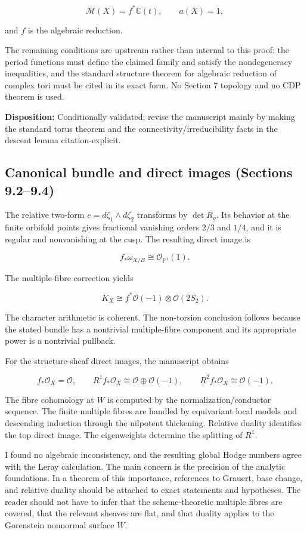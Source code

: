 \documentclass[
  10pt,
  letterpaper,
]{article}
\newcommand{\Pone}{\mathbb P^1}
\newcommand{\cO}{\mathcal O}
\begin{document}
\[
\mathcal M(X)=f^*\mathbb C(t),
\qquad a(X)=1,
\]

and \(f\) is the algebraic reduction.

The remaining conditions are upstream rather than internal to this
proof: the period functions must define the claimed family and satisfy
the nondegeneracy inequalities, and the standard structure theorem for
algebraic reduction of complex tori must be cited in its exact form. No
Section 7 topology and no CDP theorem is used.

\textbf{Disposition:} Conditionally validated; revise the manuscript
mainly by making the standard torus theorem and the
connectivity/irreducibility facts in the descent lemma
citation-explicit.

\subsection{Canonical bundle and direct images (Sections
9.2--9.4)}\label{canonical-bundle-and-direct-images-sections-9.29.4}

The relative two-form \(e=d\zeta_1\wedge d\zeta_2\) transforms by
\(\det R_g\). Its behavior at the finite orbifold points gives
fractional vanishing orders \(2/3\) and \(1/4\), and it is regular and
nonvanishing at the cusp. The resulting direct image is

\[
f_*\omega_{X/B}\cong\cO_{\Pone}(1).
\]

The multiple-fibre correction yields

\[
K_X\cong f^*\cO(-1)\otimes\cO(2S_2).
\]

The character arithmetic is coherent. The non-torsion conclusion follows
because the stated bundle has a nontrivial multiple-fibre component and
its appropriate power is a nontrivial pullback.

For the structure-sheaf direct images, the manuscript obtains

\[
f_*\cO_X=\cO,
\qquad
R^1f_*\cO_X\cong\cO\oplus\cO(-1),
\qquad
R^2f_*\cO_X\cong\cO(-1).
\]

The fibre cohomology at \(W\) is computed by the normalization/conductor
sequence. The finite multiple fibres are handled by equivariant local
models and descending induction through the nilpotent thickening.
Relative duality identifies the top direct image. The eigenweights
determine the splitting of \(R^1\).

I found no algebraic inconsistency, and the resulting global Hodge
numbers agree with the Leray calculation. The main concern is the
precision of the analytic foundations. In a theorem of this importance,
references to Grauert, base change, and relative duality should be
attached to exact statements and hypotheses. The reader should not have
to infer that the scheme-theoretic multiple fibres are covered, that the
relevant sheaves are flat, and that duality applies to the Gorenstein
nonnormal surface \(W\).
\end{document}
